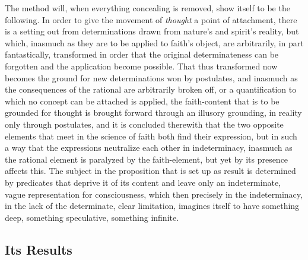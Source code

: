 \documentclass[12pt,a4paper]{book}
\begin{document}
The method will, when everything concealing is removed, show itself to be the following.
In order to give the movement of \emph{thought} a point of attachment, there is a setting out
from determinations drawn from nature's and spirit's reality, but which, inasmuch as they
are to be applied to faith's object, are arbitrarily, in part fantastically, transformed
in order that the original determinateness can be forgotten and the application become
possible. That thus transformed now becomes the ground for new determinations won by
postulates, and inasmuch as the consequences of the rational are arbitrarily broken off,
or a quantification to which no concept can be attached is applied, the faith-content that
is to be grounded for thought is brought forward through an illusory grounding, in reality
only through postulates, and it is concluded therewith that the two opposite elements that
meet in the science of faith both find their expression, but in such a way that the
expressions neutralize each other in indeterminacy, inasmuch as the rational element is
paralyzed by the faith-element, but yet by its presence affects this. The subject in the
proposition that is set up as result is determined by predicates that deprive it of its
content and leave only an indeterminate, vague representation for consciousness, which then
precisely in the indeterminacy, in the lack of the determinate, clear limitation, imagines
itself to have something deep, something speculative, something infinite.

\subsection{Its Results}
\label{ssec:results}
\end{document}
